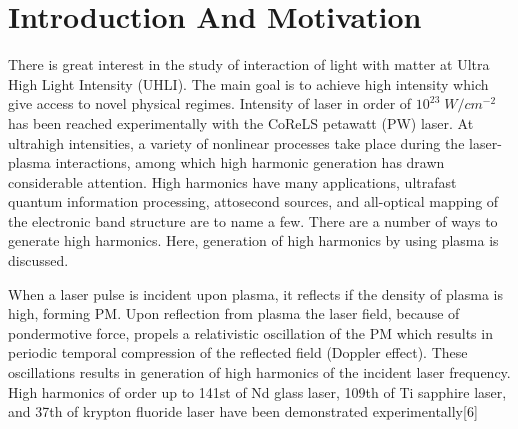 \documentclass[12pt]{article}
\newenvironment{changemargin}[2]{
\begin{list}{}{
\setlength{\topsep}{0pt}
\setlength{\leftmargin}{#1}
\setlength{\rightmargin}{#2}
\setlength{\listparindent}{\parindent}
\setlength{\itemindent}{\parindent}
\setlength{\parsep}{\parskip}
}
\item[]}{\end{list}}
\begin{document}
\newpage
\begin{changemargin}{-2cm}{-2cm}
    \section{Introduction And Motivation}
    There is great interest in the study of interaction of light with matter at Ultra High Light Intensity (UHLI). The main goal is to achieve high intensity which give access to novel physical regimes.\cite{henri}
    Intensity of laser in order of $10^{23} \; W/cm^{-2}$ has been reached experimentally with the CoReLS petawatt (PW) laser.\cite{highintensity} At ultrahigh intensities, a variety of nonlinear processes take place during the laser-plasma interactions, among which high harmonic generation has drawn considerable attention. High harmonics have many applications,  ultrafast quantum information processing, attosecond sources, and all-optical mapping of the electronic band structure are to name a few. There are a number of ways to generate high harmonics. Here, generation of high harmonics by using plasma is discussed.

    When a laser pulse is incident upon plasma, it reflects if the density of plasma is high, forming PM. Upon reflection from plasma the laser field, because of pondermotive force, propels a relativistic oscillation of the PM which results in periodic temporal compression of the reflected field (Doppler effect). These oscillations results in generation of high harmonics of the incident laser frequency.\cite{lichters} High harmonics of order up to 141st of Nd glass laser\cite{hormonics1}, 109th of Ti sapphire laser\cite{hormonics2}, and 37th of krypton fluoride laser\cite{hormonics3} have been demonstrated experimentally[6]


\end{changemargin}
\end{document}
